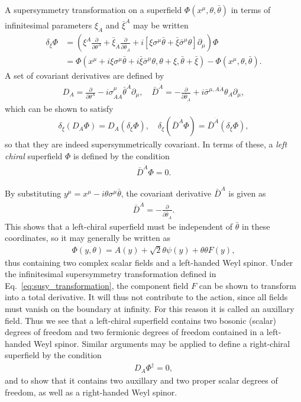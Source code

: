 \documentclass[twoside,english]{uiofysmaster}
\begin{document}
A supersymmetry transformation on a superfield $\Phi(x^\mu, \theta, \bar\theta)$ in terms of infinitesimal parameters $\xi_A$ and $\bar\xi^{\dot A}$ may be written \cite{Martin:1997ns}
\begin{align}
	\delta_\xi \Phi &= \left( \xi^A \frac{\partial}{\partial \theta^A} + \bar\xi_{\dot A}\frac{\partial}{\partial \bar\theta_{\dot A}} + i\left[ \xi\sigma^\mu \bar\theta + \bar\xi \bar\sigma^\mu \theta  \right]\partial_\mu \right)\Phi\label{eq:susy_transformation}\\
	&= \Phi(x^\mu + i\xi\sigma^\mu\bar\theta + i\bar\xi \bar\sigma^\mu \theta, \theta + \xi, \bar\theta + \bar\xi) - \Phi(x^\mu, \theta, \bar\theta).\nonumber
\end{align}
A set of covariant derivatives are defined by
\begin{align}
	D_A = \frac{\partial}{\partial \theta^A} - i\sigma^\mu_{A \dot A}\bar\theta^{\dot A}\partial_\mu, \quad \bar D^{\dot A} = -\frac{\partial}{\partial \bar \theta_{\dot A}} + i\bar\sigma^{\mu,A \dot A}\theta_A \partial_\mu,
\end{align}
which can be shown to satisfy
\begin{align}
 	\delta_\xi (D_A \Phi) = D_A ( \delta_\xi \Phi), \quad \delta_\xi (\bar D^{\dot A} \Phi ) = \bar D^{\dot A} ( \delta_\xi \Phi),
 \end{align}
 so that they are indeed supersymmetrically covariant. In terms of these, a {\it left chiral} superfield $\Phi$ is defined by the condition
\begin{align}
	\bar D^{\dot A} \Phi = 0.
\end{align}

By substituting $y^\mu = x^\mu - i\theta\sigma^\mu \bar \theta$, the covariant derivative $\bar D^{\dot A}$ is given as
\begin{align}
	\bar D^{\dot A} = -\frac{\partial}{\partial \bar\theta_{\dot A}}.
\end{align}
This shows that a left-chiral superfield must be independent of $\bar \theta$ in these coordinates, so it may generally be written as
\begin{align}
	\Phi(y, \theta) = A(y) + \sqrt{2}\theta\psi(y) + \theta\theta F(y), 
\end{align}
thus containing two complex scalar fields and a left-handed Weyl spinor. Under the infinitesimal supersymmetry transformation defined in Eq.\ \eqref{eq:susy_transformation}, the component field $F$ can be shown to transform into a total derivative. It will thus not contribute to the action, since all fields must vanish on the boundary at infinity. For this reason it is called an auxillary field. Thus we see that a left-chiral superfield contains two bosonic (scalar) degrees of freedom and two fermionic degrees of freedom contained in a left-handed Weyl spinor. Similar arguments may be applied to define a right-chiral superfield by the condition
\begin{align}
	D_A \Phi^\dag = 0,
\end{align}
and to show that it contains two auxillary and two proper scalar degrees of freedom, as well as a right-handed Weyl spinor. 
\end{document}
